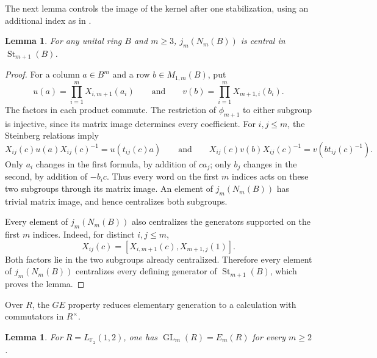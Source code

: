 \documentclass[11pt]{amsart}
\newcommand{\F}{\mathbb F}
\DeclareMathOperator{\GL}{GL}
\DeclareMathOperator{\St}{St}
\newtheorem{lemma}[theorem]{Lemma}
\theoremstyle{definition}
\theoremstyle{remark}
\numberwithin{equation}{section}
\begin{document}
The next lemma controls the image of the kernel after one stabilization, using an additional index as in \cite[Chapter~III, proof of Theorem~5.2.1]{Weibel13}.

\begin{lemma}
\label{lem:padded-centrality}
For any unital ring $B$ and $m\geq3$, $j_m(N_m(B))$ is central in $\St_{m+1}(B)$.
\end{lemma}

\begin{proof}
For a column $a\in B^m$ and a row $b\in M_{1,m}(B)$, put
$$
u(a)=\prod_{i=1}^mX_{i,m+1}(a_i)
\qquad\text{and}\qquad
v(b)=\prod_{i=1}^mX_{m+1,i}(b_i).
$$
The factors in each product commute. The restriction of $\phi_{m+1}$ to either subgroup is injective, since its matrix image determines every coefficient. For $i,j\leq m$, the Steinberg relations imply
$$
X_{ij}(c)u(a)X_{ij}(c)^{-1}=u(t_{ij}(c)a)
\qquad\text{and}\qquad
X_{ij}(c)v(b)X_{ij}(c)^{-1}=v(bt_{ij}(c)^{-1}).
$$
Only $a_i$ changes in the first formula, by addition of $ca_j$; only $b_j$ changes in the second, by addition of $-b_i c$. Thus every word on the first $m$ indices acts on these two subgroups through its matrix image. An element of $j_m(N_m(B))$ has trivial matrix image, and hence centralizes both subgroups.

Every element of $j_m(N_m(B))$ also centralizes the generators supported on the first $m$ indices. Indeed, for distinct $i,j\leq m$,
$$
X_{ij}(c)=[X_{i,m+1}(c),X_{m+1,j}(1)].
$$
Both factors lie in the two subgroups already centralized. Therefore every element of $j_m(N_m(B))$ centralizes every defining generator of $\St_{m+1}(B)$, which proves the lemma.
\end{proof}

Over $R$, the $GE$ property reduces elementary generation to a calculation with commutators in $R^\times$.

\begin{lemma}
\label{lem:elementary-generation}
For $R=L_{\F_2}(1,2)$, one has $\GL_m(R)=E_m(R)$ for every $m\geq2$.
\end{lemma}
\end{document}
